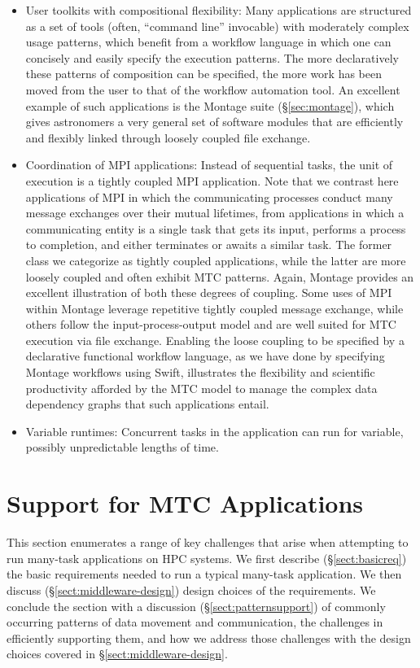 \documentclass[10pt,letterpaper]{article}
\begin{document}
\begin{itemize}
  \begin{itemize}
  \item User toolkits with compositional flexibility:
  Many applications are structured as a set of tools (often, ``command line'' invocable) with moderately complex usage patterns, which benefit from a workflow language in which one can concisely and easily specify the execution patterns. The more declaratively these patterns of composition can be specified, the more work has been moved from the user to that of the workflow automation tool.
An excellent example of such applications is the Montage suite (\S\ref{sec:montage}), which gives astronomers a very general set of software modules that are efficiently and flexibly linked through loosely coupled file exchange.
  \item Coordination of MPI applications: Instead of sequential tasks,
    the unit of execution is a tightly coupled MPI application.
    Note that we contrast here applications of MPI in which the communicating processes conduct many message exchanges over their mutual lifetimes, from applications in which a communicating entity is a single task that gets its input, performs a process to completion, and either terminates or awaits a similar task. The former class we categorize as tightly coupled applications, while the latter are more loosely coupled and often exhibit MTC patterns.
    Again, Montage provides an excellent illustration of both these degrees of coupling. Some uses of MPI within Montage leverage repetitive tightly coupled message exchange, while others follow the input-process-output model and are well suited for MTC execution via file exchange. Enabling the loose coupling to be specified by a declarative functional workflow language, as we have done by specifying Montage workflows using Swift, illustrates the flexibility and scientific productivity afforded by the MTC model to manage the complex data dependency graphs that such applications entail.
  \item Variable runtimes: Concurrent tasks in the application
    can run for variable, possibly unpredictable lengths of time.
  \end{itemize}

\end{itemize}


\section{Support for MTC Applications\label{sec:support}}
This section enumerates a range of key challenges that arise when attempting
to run many-task applications on HPC systems. We first describe (\S\ref{sect:basicreq}) 
the basic requirements needed to run a typical many-task application.
We then discuss
(\S\ref{sect:middleware-design}) design choices of the requirements.
We conclude the section with a discussion
(\S\ref{sect:patternsupport}) of commonly occurring patterns of
data movement and communication, the challenges in efficiently supporting
them, and how we address those challenges with the design choices covered in
\S\ref{sect:middleware-design}.
\end{document}
